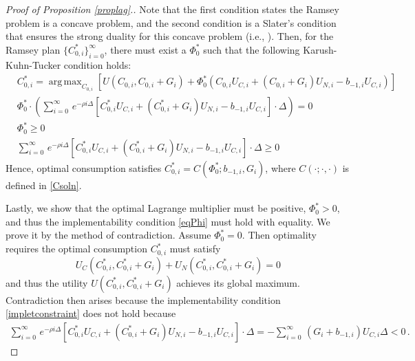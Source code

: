 \documentclass[12pt]{article}
\DeclareMathOperator*{\argmax}{arg\,max}
\begin{document}
\begin{proof}[Proof of Proposition \ref{proplag}.]


Note that the first condition states the Ramsey problem is a concave problem, and the second condition is a Slater's condition that ensures the strong duality for this concave problem (i.e., \citealp{boyd2004convex}).
Then, for the Ramsey plan $\{C_{0, i}^*\}_{i=0}^\infty$, there must exist a $\Phi_0^*$ such that the following
Karush-Kuhn-Tucker condition holds:
\begin{align*}
& C_{0, i}^* = \argmax_{C_{0, i}}  \left[ U(C_{0, i}, C_{0, i}+G_{i})+ \Phi_0^*\left( C_{0, i}U_{C, i}+(C_{0, i}+G_{i})U_{N, i}-b_{-1, i} U_{C, i} \right) \right] \\
& 	\Phi_0^* \cdot \left( \sum_{i=0}^\infty \, e^{-\rho i\Delta} \left[ C_{0, i}^*U_{C, i}+(C_{0, i}^*+G_{i})U_{N, i} - b_{-1, i} U_{C, i} \right]\cdot\Delta \right) =0 \\
& 	\Phi_0^*\geq 0\\
&	\sum_{i=0}^\infty \, e^{-\rho i\Delta} \left[ C_{0, i}^*U_{C, i}+(C_{0, i}^*+G_{i})U_{N, i} - b_{-1, i} U_{C, i} \right]\cdot\Delta \geq 0
\end{align*}
Hence,  optimal consumption satisfies $C_{0, i}^*=C(\Phi_0^*; b_{-1, i}, G_i)$, where $C(\cdot; \cdot, \cdot)$ is defined in \eqref{Csoln}.

Lastly, we show that the optimal Lagrange multiplier must be positive, $\Phi_0^*>0$,  and thus
the implementability condition \eqref{eqPhi} must hold with equality. We prove it by the method of contradiction. Assume $\Phi_0^*=0$. Then optimality requires the optimal consumption $C_{0, i}^*$ must satisfy
\begin{equation*}
U_{C}(C_{0, i}^*, C_{0, i}^*+G_i) + U_{N}(C_{0, i}^*, C_{0, i}^*+G_i) = 0\,
\end{equation*}
and thus the utility $U(C_{0, i}^*, C_{0, i}^*+G_i)$ achieves its global maximum. Contradiction then arises because the implementability condition \eqref{impletconstraint} does not hold because
\begin{eqnarray*}
\sum_{i=0}^\infty \, e^{-\rho i\Delta} \left[ C_{0, i}^*U_{C, i}+(C_{0, i}^*+G_{i})U_{N, i} - b_{-1, i} U_{C, i} \right]\cdot\Delta = - \sum_{i=0}^\infty \, \left(G_i+b_{-1, i} \right)U_{C, i}\Delta <0  \,.
\end{eqnarray*}

\end{proof}
\end{document}
